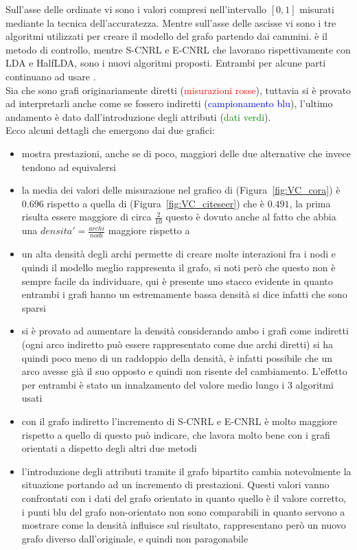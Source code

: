 %
Sull'asse delle ordinate vi sono i valori compresi nell'intervallo $[0, 1]$ misurati mediante la tecnica dell'accuratezza. Mentre sull'asse delle ascisse vi sono i tre algoritmi utilizzati per creare il modello del grafo partendo dai cammini. \wv è il metodo di controllo, mentre S-CNRL e E-CNRL che lavorano rispettivamente con LDA e HalfLDA, sono i nuovi algoritmi proposti. Entrambi per alcune parti continuano ad usare \wv.\\
Sia \cora che \citeseer sono grafi originariamente diretti (\textcolor{red}{misurazioni rosse}), tuttavia si è provato ad interpretarli anche come se fossero indiretti (\textcolor{blue}{campionamento blu}), l'ultimo andamento è dato dall'introduzione degli attributi (\textcolor{green}{dati verdi}).\\
Ecco alcuni dettagli che emergono dai due grafici:
\begin{itemize}
	\item \wv mostra prestazioni, anche se di poco, maggiori delle due alternative che invece tendono ad equivalersi
	\item la media dei valori delle misurazione nel grafico di \cora (Figura~\ref{fig:VC_cora}) è $0.696$ rispetto a quella di \citeseer (Figura~\ref{fig:VC_citeseer}) che è $0.491$, la prima risulta essere maggiore di circa $\displaystyle \frac{2}{10}$ questo è dovuto anche al fatto che \cora abbia una $\displaystyle densita' = \frac{archi}{nodi}$ maggiore rispetto a \citeseer
	\item un alta densità degli archi permette di creare molte interazioni fra i nodi e quindi il modello meglio rappresenta il grafo, si noti però che questo non è sempre facile da individuare, qui è presente uno stacco evidente in quanto entrambi i grafi hanno un estremamente bassa densità si dice infatti che sono sparsi
	\item si è provato ad aumentare la densità considerando ambo i grafi come indiretti (ogni arco indiretto può essere rappresentato come due archi diretti) si ha quindi poco meno di un raddoppio della densità, è infatti possibile che un arco avesse già il suo opposto e quindi non risente del cambiamento.
	L'effetto per entrambi è stato un innalzamento del valore medio lungo i 3 algoritmi usati
	\item con il grafo indiretto l'incremento di S-CNRL e E-CNRL è molto maggiore rispetto a quello di \wv questo può indicare, che \wv lavora molto bene con i grafi orientati a dispetto degli altri due metodi
	\item l'introduzione degli attributi tramite il grafo bipartito cambia notevolmente la situazione portando ad un incremento di prestazioni. Questi valori vanno confrontati con i dati del grafo orientato in quanto quello è il valore corretto, i punti blu del grafo non-orientato non sono comparabili in quanto servono a mostrare come la densità influisce sul risultato, rappresentano però un nuovo grafo diverso dall'originale, e quindi non paragonabile
\end{itemize}
%
